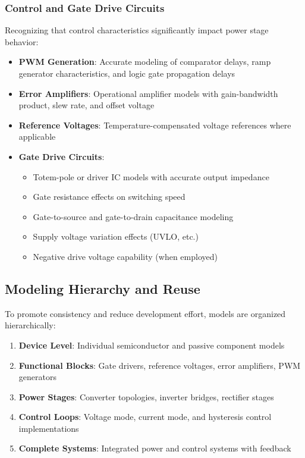 \subsubsection{Control and Gate Drive Circuits}
Recognizing that control characteristics significantly impact power stage behavior:
\begin{itemize}
    \item \textbf{PWM Generation}: Accurate modeling of comparator delays, ramp generator characteristics, and logic gate propagation delays
    \item \textbf{Error Amplifiers}: Operational amplifier models with gain-bandwidth product, slew rate, and offset voltage
    \item \textbf{Reference Voltages}: Temperature-compensated voltage references where applicable
    \item \textbf{Gate Drive Circuits}:
    \begin{itemize}
        \item Totem-pole or driver IC models with accurate output impedance
        \item Gate resistance effects on switching speed
        \item Gate-to-source and gate-to-drain capacitance modeling
        \item Supply voltage variation effects (UVLO, etc.)
        \item Negative drive voltage capability (when employed)
    \end{itemize}
\end{itemize}

\subsection{Modeling Hierarchy and Reuse}
To promote consistency and reduce development effort, models are organized hierarchically:
\begin{enumerate}
    \item \textbf{Device Level}: Individual semiconductor and passive component models
    \item \textbf{Functional Blocks}: Gate drivers, reference voltages, error amplifiers, PWM generators
    \item \textbf{Power Stages}: Converter topologies, inverter bridges, rectifier stages
    \item \textbf{Control Loops}: Voltage mode, current mode, and hysteresis control implementations
    \item \textbf{Complete Systems}: Integrated power and control systems with feedback
\end{enumerate}

